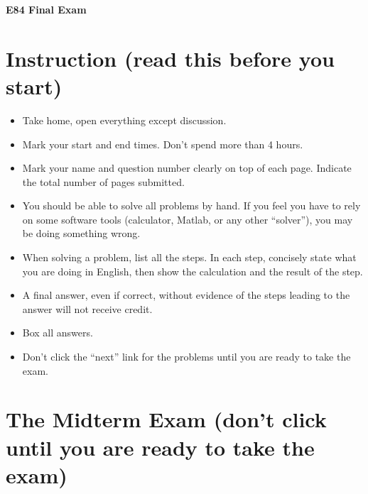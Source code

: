 \usepackage{html}

\begin{center}
{\Large \bf E84 Final Exam}
\end{center}

\section*{Instruction (read this before you start)}

\begin{itemize}
\item Take home, open everything except discussion. 
\item Mark your start and end times. Don't spend more than 4 hours.
\item Mark your name and question number clearly on top of each page.
  Indicate the total number of pages submitted.
\item You should be able to solve all problems by hand. If you feel you 
  have to rely on some software tools (calculator, Matlab, or any other
  ``solver''), you may be doing something wrong.
\item When solving a problem, list all the steps. In each step, concisely
  state what you are doing in English, then show the calculation and the 
  result of the step. 
\item A final answer, even if correct, without evidence of the steps 
  leading to the answer will not receive credit.
\item Box all answers.
\item Don't click the ``next'' link for the problems until you are ready 
  to take the exam.
\end{itemize}

\section*{The Midterm Exam (don't click until you are ready to take the exam)}


